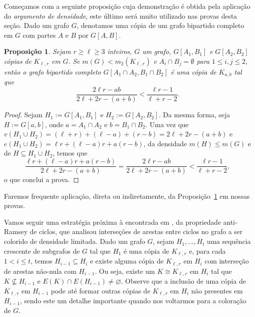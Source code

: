 \documentclass[11pt,twoside,a4paper]{book}
\newcommand{\K}{K_{\ell,r}} %
\let\subset\subseteq
\newtheorem{proposicao} [teorema] {Proposição}
\theoremstyle{note}
\begin{document}
     Começamos com a seguinte proposição cuja demonstração é obtida
     pela aplicação do \textit{argumento de densidade}, este último  será muito utilizado nas provas desta seção.
    Dado um grafo $G$, denotamos uma cópia de um grafo bipartido completo em $G$ com partes $A$ e $B$ por $G[A,B]$.
    
    \begin{proposicao}
        \label{lemma:inter_a} 
    Sejam $r\geq \ell\geq 3$ inteiros, $G$ um grafo, $G[A_1,B_1]$ e $G[A_2,B_2]$ cópias de $K_{\ell,r}$ em $G$. 
    Se $m(G) < m_2(\K)$ e
    $A_i \cap B_j = \emptyset$ 
    para $1\leq i,j\leq 2$, então o grafo bipartido completo
    $G[A_1\cap A_2, B_1\cap B_2]$ é uma cópia de $K_{a,b}$ tal que
      \begin{equation}
         \label{eq:pairs-ab} 
    	 \frac{2\ell r - ab}{2\ell + 2r - (a+b)} <
    \frac{\ell r - 1}{\ell + r - 2}.
      \end{equation}
      \end{proposicao}
    \begin{proof}
    Sejam $H_1:=G[A_1,B_1]$ e $H_2:=G[A_2,B_2]$.
    Da mesma forma, seja $H:= G[a,b]$, onde $a = A_1\cap
    A_2$ e $b = B_1\cap B_2$.  
    Uma vez que 
    $v(H_1 \cup H_2) = (\ell + r) +
    (\ell-a) + (r - b) = 2\ell + 2r - (a+b)$ 
    e $e(H_1 \cup H_2) = \ell r + (\ell-a)r + a(r-b)$, 
    da densidade $m(H) \leq m(G)$ e de $H\subset H_1\cup
    H_2$, temos que
      \begin{equation*} 
      \frac{\ell r + (\ell-a)r + a(r-b)}{2\ell + 2r -
    (a+b)} = \frac{2\ell r - ab}{2\ell + 2r - (a+b)} < \frac{\ell r -
    1}{\ell + r - 2},
      \end{equation*}
      o que conclui a prova.
    \end{proof}
    
    Faremos frequente aplicação, direta ou indiretamente, da Proposição~\ref{lemma:inter_a} em nossas provas.
     
     Vamos seguir uma estratégia próxima à encontrada em \cite{barros2021anti}, da propriedade anti-Ramsey de ciclos, que analisou interseções de arestas entre ciclos no grafo a ser colorido de densidade limitada.
     Dado um grafo $G$, sejam $H_1, \ldots, H_t$ uma sequência crescente de subgrafos de $G$ tal que
    $H_1$ é uma cópia de $\K$ e, para cada $1 < i \leq t$, temos $H_{i-1} \subseteq H_i$ e existe alguma cópia de $\K$ em $H_{i}$ com interseção de arestas não-nula com $H_{i-1}$. 
    Ou seja, existe um $K \cong \K$ em $H_{i}$ tal que $K \not\subset H_{i-1}$ e $E(K) \cap E(H_{i-1}) \neq\varnothing$.
     Observe que a inclusão de uma cópia de $\K$ em $H_{i-1}$ pode até formar outras cópias de $\K$ em $H_{i}$ não presentes em $H_{i-1}$, sendo este um detalhe importante quando nos voltarmos para a coloração de $G$.
     
\end{document}
